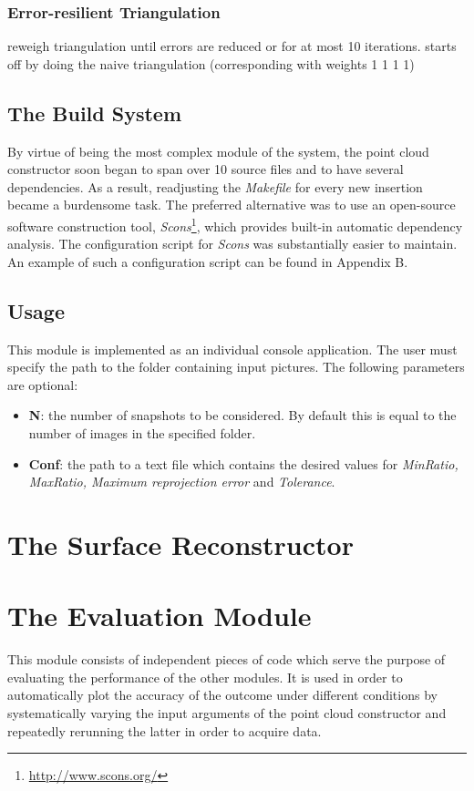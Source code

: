 \documentclass[12pt,a4paper,twoside,openright]{report}
\begin{document}
\subsubsection{Error-resilient Triangulation}
reweigh triangulation until errors are reduced or for at most 10 iterations.
starts off by doing the naive triangulation (corresponding with weights 1 1 1 1)

\subsection{The Build System}
By virtue of being the most complex module of the system, the point cloud constructor soon began to span over 10 source files and to have several dependencies. As a result, readjusting the \emph{Makefile} for every new insertion became a burdensome task. The preferred alternative was to use an open-source software construction tool, \emph{Scons}\footnote{\url{http://www.scons.org/}}, which provides built-in automatic dependency analysis. The configuration script for \emph{Scons} was substantially easier to maintain. An example of such a configuration script can be found in Appendix B.

\subsection{Usage}
This module is implemented as an individual console application. The user must specify the path to the folder containing input pictures. The following parameters are optional:
\begin{itemize}
\item \textbf{N}: the number of snapshots to be considered. By default this is equal to the number of images in the specified folder. 
\item \textbf{Conf}: the path to a text file which contains the desired values for \emph{MinRatio, MaxRatio, Maximum reprojection error} and \emph{Tolerance}.
\end{itemize}

\section{The Surface Reconstructor}


\section{The Evaluation Module}
This module consists of independent pieces of code which serve the purpose of evaluating the performance of the other modules. It is used in order to automatically plot the accuracy of the outcome under different conditions by systematically varying the input arguments of the point cloud constructor and repeatedly rerunning the latter in order to acquire data. 
\end{document}

